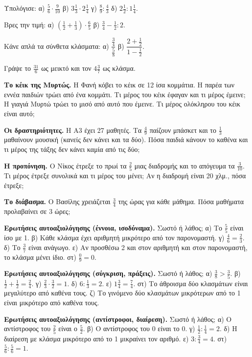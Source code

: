 \ex Υπολόγισε: α) $\frac{5}{6}\cdot\frac{9}{10}$ \quad β) $3\frac{1}{3}\cdot 2\frac{1}{4}$ \quad γ) $\frac{8}{9}:\frac{4}{3}$ \quad δ) $2\frac{1}{2}:1\frac{1}{4}$.

\ex Βρες την τιμή: α) $\left(\frac{1}{2}+\frac{1}{3}\right)\cdot\frac{6}{5}$ \quad β) $\frac{3}{4}-\frac{1}{2}:2$.

\ex Κάνε απλά τα σύνθετα κλάσματα: α) $\dfrac{\frac{3}{4}}{\frac{5}{8}}$ \quad β) $\dfrac{2+\frac{1}{2}}{1-\frac{1}{2}}$.

\ex Γράψε το $\frac{31}{6}$ ως μεικτό και τον $4\frac{3}{7}$ ως κλάσμα.

\ex \textbf{Το κέικ της Μυρτώς.} Η Φανή κόβει το κέικ σε 12 ίσα κομμάτια. Η παρέα των εννέα παιδιών τρώει από ένα κομμάτι. Τι μέρος του κέικ έφαγαν και τι μέρος έμεινε; Η γιαγιά Μυρτώ τρώει το μισό από αυτό που έμεινε. Τι μέρος ολόκληρου του κέικ είναι αυτό;

\ex \textbf{Οι δραστηριότητες.} Η Α3 έχει 27 μαθητές. Τα $\frac{4}{9}$ παίζουν μπάσκετ και το $\frac{1}{3}$ μαθαίνουν μουσική (κανείς δεν κάνει και τα δύο). Πόσα παιδιά κάνουν το καθένα και τι μέρος της τάξης δεν κάνει καμία από τις δύο;

\ex \textbf{Η προπόνηση.} Ο Νίκος έτρεξε το πρωί τα $\frac{2}{5}$ μιας διαδρομής και το απόγευμα τα $\frac{3}{10}$. Τι μέρος έτρεξε συνολικά και τι μέρος του μένει; Αν η διαδρομή είναι 20 χλμ., πόσα έτρεξε;

\ex \textbf{Το διάβασμα.} Ο Βασίλης χρειάζεται $\frac{3}{4}$ της ώρας για κάθε μάθημα. Πόσα μαθήματα προλαβαίνει σε 3 ώρες;

\ex \textbf{Ερωτήσεις αυτοαξιολόγησης (έννοια, ισοδύναμα).} Σωστό ή λάθος; α) Το $\frac{5}{5}$ είναι ίσο με 1. \quad β) Κάθε κλάσμα έχει αριθμητή μικρότερο από τον παρονομαστή. \quad γ) $\frac{4}{6}=\frac{2}{3}$. \quad δ) Το $\frac{3}{7}$ είναι ανάγωγο. \quad ε) Αν προσθέσω 2 και στον αριθμητή και στον παρονομαστή, το κλάσμα μένει ίδιο. \quad στ) $\frac{0}{9}=0$.

\ex \textbf{Ερωτήσεις αυτοαξιολόγησης (σύγκριση, πράξεις).} Σωστό ή λάθος; α) $\frac{3}{8}>\frac{3}{5}$. \quad β) $\frac{1}{2}+\frac{1}{2}=\frac{2}{4}$. \quad γ) $\frac{2}{3}\cdot\frac{3}{2}=1$. \quad δ) $6:\frac{1}{3}=2$. \quad ε) $1\frac{3}{4}=\frac{7}{4}$. \quad στ) Το άθροισμα δύο κλασμάτων είναι μεγαλύτερο από καθένα τους. \quad ζ) Το γινόμενο δύο κλασμάτων μικρότερων από το 1 είναι μικρότερο από καθένα τους.

\ex \textbf{Ερωτήσεις αυτοαξιολόγησης (αντίστροφοι, διαίρεση).} Σωστό ή λάθος; α) Ο αντίστροφος του $\frac{2}{5}$ είναι ο $\frac{5}{2}$. \quad β) Ο αντίστροφος του 0 είναι το 0. \quad γ) $\frac{1}{2}:\frac{1}{4}=2$. \quad δ) Η διαίρεση με κλάσμα μικρότερο από το 1 μικραίνει τον αριθμό. \quad ε) $3:\frac{3}{4}=4$. \quad στ) $\frac{5}{6}:\frac{5}{6}=1$.

